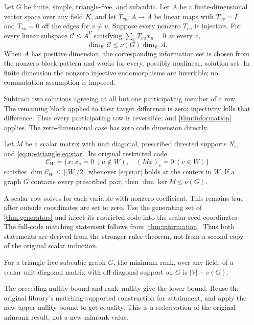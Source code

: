 \begin{theorem}\label{thm:blocks}
Let $G$ be finite, simple, triangle-free, and subcubic. Let $A$ be a
finite-dimensional vector space over any field $K$, and let
$T_{vu}:A\to A$ be linear maps with $T_{vv}=I$ and $T_{vu}=0$ off the
edges for $v\ne u$. Suppose every nonzero $T_{vu}$ is injective.
For every linear subspace $\mathcal C\le A^V$ satisfying
$\sum_uT_{vu}x_u=0$ at every $v$,
\[
 \dim_K\mathcal C\le\nu(G)\dim_K A.
\]
When $A$ has positive dimension, the corresponding information set is chosen
from the nonzero block pattern and works for every, possibly nonlinear,
solution set. In finite dimension the nonzero injective endomorphisms are
invertible; no commutation assumption is imposed.
\end{theorem}
\begin{outline}
Subtract two solutions agreeing at all but one participating member of a
row. The remaining block applied to their target difference is zero;
injectivity kills that difference. Thus every participating row is
reversible, and \cref{thm:information} applies. The zero-dimensional case
has zero code dimension directly.
\end{outline}

\begin{corollary}\label{cor:scalar}
Let $M$ be a scalar matrix with unit diagonal, prescribed directed supports
$N_v$, and \cref{eq:no-triangle,eq:star}. Its original restricted code
\[
 \mathcal C_W=\{x:x_u=0\ (u\notin W),\quad (Mx)_v=0\ (v\in W)\}
\]
satisfies $\dim\mathcal C_W\le\lfloor|W|/2\rfloor$ whenever
\cref{eq:star} holds at the centers in $W$. If a graph $G$ contains every
prescribed pair, then $\dim\ker M\le\nu(G)$.
\end{corollary}
\begin{outline}
A scalar row solves for each variable with nonzero coefficient. This
remains true after outside coordinates are set to zero. Use the generating
set of \cref{thm:generators} and inject its restricted code into the scalar
seed coordinates. The full-code matching statement follows from
\cref{thm:information}. Thus both statements are derived from the stronger
rules theorem, not from a second copy of the original scalar induction.
\end{outline}

\begin{corollary}\label{cor:minrank}
For a triangle-free subcubic graph $G$, the minimum rank, over any field,
of a scalar unit-diagonal matrix with off-diagonal support on $G$ is
$|V|-\nu(G)$.
\end{corollary}
\begin{outline}
The preceding nullity bound and rank--nullity give the lower bound. Reuse
the original library's matching-supported construction for attainment,
and apply the new upper nullity bound to get equality. This is a
rederivation of the original minrank result, not a new minrank value.
\end{outline}

